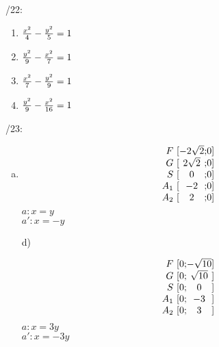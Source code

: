 /22:
\begin{enumerate}
	\item $\frac{x^2}{4} - \frac{y^2}{5} = 1$
	\item $\frac{y^2}{9} - \frac{x^2}7 = 1$
	\item $\frac{x^2}7 - \frac{y^2}9 = 1$
	\item $\frac{y^2}{9} - \frac{x^2}{16} = 1$
\end{enumerate}
/23:
\begin{enumerate}[a)]
	\item
		\begin{minipage}{0.4\textwidth}
		\end{minipage}
		\begin{minipage}{0.4\textwidth}
			$$
			\begin{array}{r@{\ [}c@{;}c@{]}}
				F & -2\sqrt 2 & 0 \\
				G & 2\sqrt 2 & 0 \\
				S& 0 & 0 \\
				A_1 & -2 & 0 \\
				A_2 & 2 & 0\\
			\end{array}
			$$
			$a: x=y$\\
			$a': x=-y$
		\end{minipage}
	\item[d)]
		\begin{minipage}{0.4\textwidth}
		\end{minipage}
		\begin{minipage}{0.4\textwidth}
			$$
			\begin{array}{r@{\ [}c@{;}c@{]}}
				F & 0 & -\sqrt {10} \\
				G & 0 & \sqrt{10} \\
				S& 0 & 0 \\
				A_1 & 0 & -3 \\
				A_2 & 0 & 3\\
			\end{array}
			$$
			$a: x=3y$\\
			$a': x=-3y$
		\end{minipage}
\end{enumerate}

